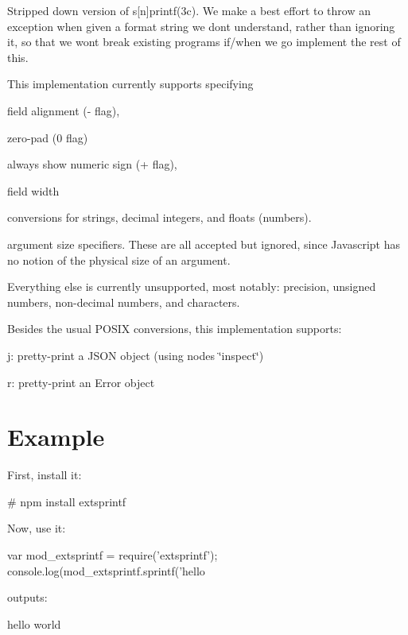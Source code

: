 Stripped down version of s\mbox{[}n\mbox{]}printf(3c). We make a best effort to throw an exception when given a format string we don\textquotesingle{}t understand, rather than ignoring it, so that we won\textquotesingle{}t break existing programs if/when we go implement the rest of this.

This implementation currently supports specifying


\begin{DoxyItemize}
\item field alignment (\textquotesingle{}-\/\textquotesingle{} flag),
\item zero-\/pad (\textquotesingle{}0\textquotesingle{} flag)
\item always show numeric sign (\textquotesingle{}+\textquotesingle{} flag),
\item field width
\item conversions for strings, decimal integers, and floats (numbers).
\item argument size specifiers. These are all accepted but ignored, since Javascript has no notion of the physical size of an argument.
\end{DoxyItemize}

Everything else is currently unsupported, most notably\+: precision, unsigned numbers, non-\/decimal numbers, and characters.

Besides the usual P\+O\+S\+IX conversions, this implementation supports\+:


\begin{DoxyItemize}
\item {\ttfamily j}\+: pretty-\/print a J\+S\+ON object (using node\textquotesingle{}s \char`\"{}inspect\char`\"{})
\item {\ttfamily r}\+: pretty-\/print an Error object
\end{DoxyItemize}

\section*{Example}

First, install it\+: \begin{DoxyVerb}# npm install extsprintf
\end{DoxyVerb}


Now, use it\+: \begin{DoxyVerb}var mod_extsprintf = require('extsprintf');
console.log(mod_extsprintf.sprintf('hello %
\end{DoxyVerb}


outputs\+: \begin{DoxyVerb}hello                     world\end{DoxyVerb}
 
